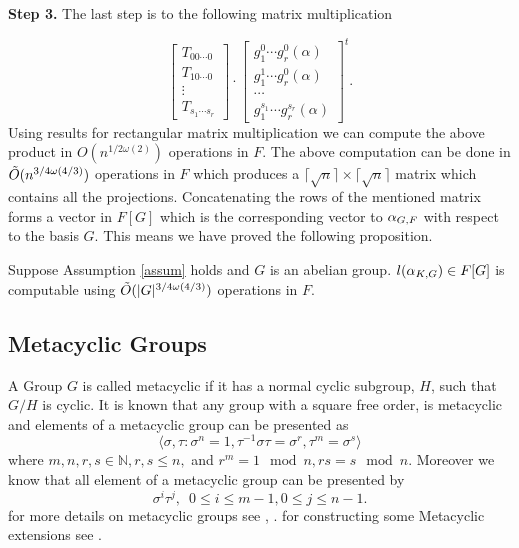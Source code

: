 \textbf{Step 3.} The last step is to the following matrix multiplication

$$
\left[ \begin{array}{c}
T_{00\cdots 0}\\
\hline
T_{10\cdots 0}\\
\hline
\vdots\\
\hline
T_{s_1 \cdots s_r}
\end{array} \right]
\cdot
\left[\begin{array}{c}
g_1^{0}\cdots g_r^{0}(\alpha) \\
\hline
g_1^{1}\cdots g_r^{0}(\alpha) \\
\hline
\cdots \\
\hline
g_1^{s_1}\cdots g_r^{s_r}(\alpha)  
\end{array}\right]^t.
$$
Using results for rectangular matrix multiplication we can compute the above product in $O(n^{1/2\omega(2)})$ operations in $F$.
The above computation can be done in $\tilde{O}(n^{3/4 \omega(4/3)})$ operations in $F$ which produces a $\lceil \sqrt{n} \rceil \times \lceil
 \sqrt{n} \rceil$ matrix which contains all the projections. Concatenating the rows of the mentioned matrix forms a vector in
 $F[G]$ which is the corresponding vector to $\alpha_{G,F}$ with respect to the basis $G$. This means we have proved the following
 proposition.

\begin{proposition}
Suppose Assumption \ref{assum} holds and $G$ is an abelian group. $l(\alpha_{K,G}) \in F[G]$ is computable using $\tilde{O}(\vert G \vert ^{3/4 \omega(4/3)})$ 
operations in $F$.
\end{proposition}

\subsection{Metacyclic Groups}

A Group $G$ is called metacyclic if it has a normal cyclic subgroup, $H$, such that $G/H$ is cyclic. It is known that any group
with a square free order, is metacyclic and elements of a metacyclic group can be presented as 
\begin{equation}\label{eq:metacyclic}
\langle \sigma,\tau: \sigma^n = 1, \tau^{-1}\sigma \tau = \sigma^r, \tau ^m = \sigma^s \rangle
\end{equation}
where $m,n,r,s \in \mathbb{N}, r,s \leq n,$ and $r^m = 1 \mod n , rs = s \mod n$. Moreover we know that all element of a metacyclic
 group can be presented by $$\sigma^i \tau^j, \,\,\, 0\leq i \leq m-1, 0\leq j \leq n-1.$$ 
for more details on metacyclic groups see \cite[P.88, Proposition 1]{Johnson}, \cite[P.334]{Curtis}. for constructing some 
Metacyclic extensions see \cite{Kida}.

